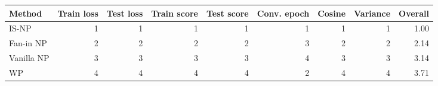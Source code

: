 \begin{tabular}{lrrrrrrrr}
\toprule
Method & Train loss & Test loss & Train score & Test score & Conv. epoch & Cosine & Variance & Overall \\
\midrule
IS-NP & 1 & 1 & 1 & 1 & 1 & 1 & 1 & 1.00 \\
Fan-in NP & 2 & 2 & 2 & 2 & 3 & 2 & 2 & 2.14 \\
Vanilla NP & 3 & 3 & 3 & 3 & 4 & 3 & 3 & 3.14 \\
WP & 4 & 4 & 4 & 4 & 2 & 4 & 4 & 3.71 \\
\bottomrule
\end{tabular}
